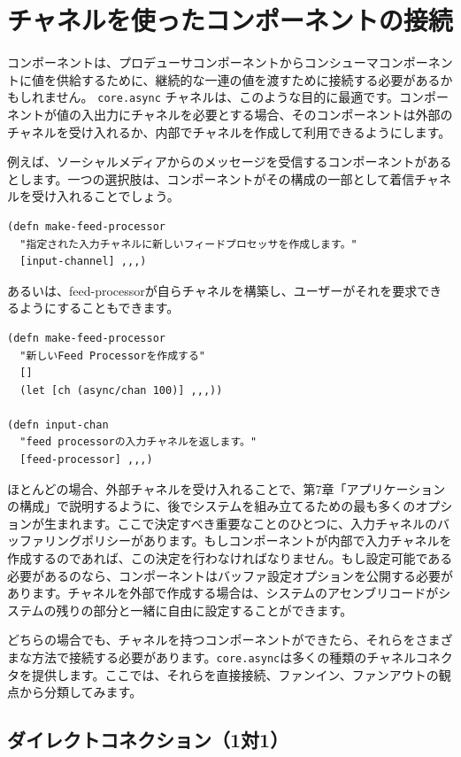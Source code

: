 \section{チャネルを使ったコンポーネントの接続}

コンポーネントは、プロデューサコンポーネントからコンシューマコンポーネントに値を供給するために、継続的な一連の値を渡すために接続する必要があるかもしれません。 \texttt{core.async} チャネルは、このような目的に最適です。コンポーネントが値の入出力にチャネルを必要とする場合、そのコンポーネントは外部のチャネルを受け入れるか、内部でチャネルを作成して利用できるようにします。

例えば、ソーシャルメディアからのメッセージを受信するコンポーネントがあるとします。一つの選択肢は、コンポーネントがその構成の一部として着信チャネルを受け入れることでしょう。

\begin{lstlisting}[numbers=none]
(defn make-feed-processor
  "指定された入力チャネルに新しいフィードプロセッサを作成します。"
  [input-channel] ,,,)  
\end{lstlisting}

あるいは、feed-processorが自らチャネルを構築し、ユーザーがそれを要求できるようにすることもできます。

\begin{lstlisting}[numbers=none]
(defn make-feed-processor
  "新しいFeed Processorを作成する"
  []
  (let [ch (async/chan 100)] ,,,))

(defn input-chan
  "feed processorの入力チャネルを返します。"
  [feed-processor] ,,,)
\end{lstlisting}


ほとんどの場合、外部チャネルを受け入れることで、第7章「アプリケーションの構成」で説明するように、後でシステムを組み立てるための最も多くのオプションが生まれます。ここで決定すべき重要なことのひとつに、入力チャネルのバッファリングポリシーがあります。もしコンポーネントが内部で入力チャネルを作成するのであれば、この決定を行わなければなりません。もし設定可能である必要があるのなら、コンポーネントはバッファ設定オプションを公開する必要があります。チャネルを外部で作成する場合は、システムのアセンブリコードがシステムの残りの部分と一緒に自由に設定することができます。

どちらの場合でも、チャネルを持つコンポーネントができたら、それらをさまざまな方法で接続する必要があります。\texttt{core.async}は多くの種類のチャネルコネクタを提供します。ここでは、それらを直接接続、ファンイン、ファンアウトの観点から分類してみます。

\subsection{ダイレクトコネクション（1対1）}

